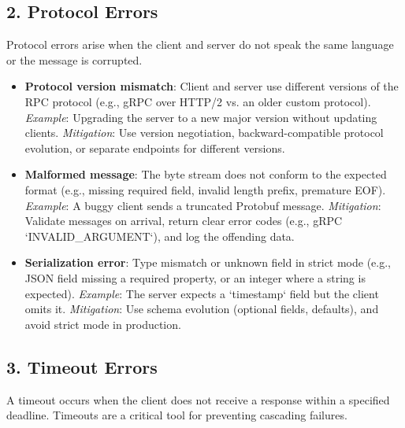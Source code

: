 \documentclass[10pt,a4paper]{article}
\begin{document}
\subsection{2. Protocol Errors}
Protocol errors arise when the client and server do not speak the same language or the message is corrupted.

\begin{itemize}
    \item \textbf{Protocol version mismatch}: Client and server use different versions of the RPC protocol (e.g., gRPC over HTTP/2 vs. an older custom protocol).  
        \textit{Example}: Upgrading the server to a new major version without updating clients.  
        \textit{Mitigation}: Use version negotiation, backward-compatible protocol evolution, or separate endpoints for different versions.
    
    \item \textbf{Malformed message}: The byte stream does not conform to the expected format (e.g., missing required field, invalid length prefix, premature EOF).  
        \textit{Example}: A buggy client sends a truncated Protobuf message.  
        \textit{Mitigation}: Validate messages on arrival, return clear error codes (e.g., gRPC `INVALID\_ARGUMENT`), and log the offending data.
    
    \item \textbf{Serialization error}: Type mismatch or unknown field in strict mode (e.g., JSON field missing a required property, or an integer where a string is expected).  
        \textit{Example}: The server expects a `timestamp` field but the client omits it.  
        \textit{Mitigation}: Use schema evolution (optional fields, defaults), and avoid strict mode in production.
\end{itemize}

\subsection{3. Timeout Errors}
A timeout occurs when the client does not receive a response within a specified deadline. Timeouts are a critical tool for preventing cascading failures.
\end{document}
